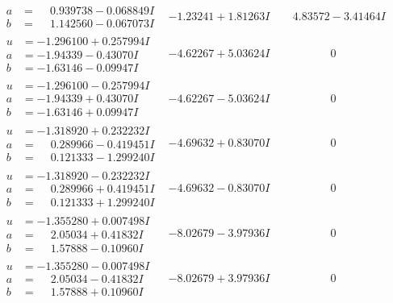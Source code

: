 \documentclass[1p]{elsarticle_modified}
\theoremstyle{definition}
\begin{document}
$$\begin{array}{c|c|c}
\begin{aligned}
a &= \phantom{-}0.939738 - 0.068849 I \\
b &= \phantom{-}1.142560 - 0.067073 I\end{aligned}
 & -1.23241 + 1.81263 I & \phantom{-}4.83572 - 3.41464 I \\ \hline\begin{aligned}
u &= -1.296100 + 0.257994 I \\
a &= -1.94339 - 0.43070 I \\
b &= -1.63146 - 0.09947 I\end{aligned}
 & -4.62267 + 5.03624 I & \phantom{-0.000000 } 0 \\ \hline\begin{aligned}
u &= -1.296100 - 0.257994 I \\
a &= -1.94339 + 0.43070 I \\
b &= -1.63146 + 0.09947 I\end{aligned}
 & -4.62267 - 5.03624 I & \phantom{-0.000000 } 0 \\ \hline\begin{aligned}
u &= -1.318920 + 0.232232 I \\
a &= \phantom{-}0.289966 - 0.419451 I \\
b &= \phantom{-}0.121333 - 1.299240 I\end{aligned}
 & -4.69632 + 0.83070 I & \phantom{-0.000000 } 0 \\ \hline\begin{aligned}
u &= -1.318920 - 0.232232 I \\
a &= \phantom{-}0.289966 + 0.419451 I \\
b &= \phantom{-}0.121333 + 1.299240 I\end{aligned}
 & -4.69632 - 0.83070 I & \phantom{-0.000000 } 0 \\ \hline\begin{aligned}
u &= -1.355280 + 0.007498 I \\
a &= \phantom{-}2.05034 + 0.41832 I \\
b &= \phantom{-}1.57888 - 0.10960 I\end{aligned}
 & -8.02679 - 3.97936 I & \phantom{-0.000000 } 0 \\ \hline\begin{aligned}
u &= -1.355280 - 0.007498 I \\
a &= \phantom{-}2.05034 - 0.41832 I \\
b &= \phantom{-}1.57888 + 0.10960 I\end{aligned}
 & -8.02679 + 3.97936 I & \phantom{-0.000000 } 0 \\ \hline\begin{aligned}

\end{aligned}
\end{array}$$
\end{document}
